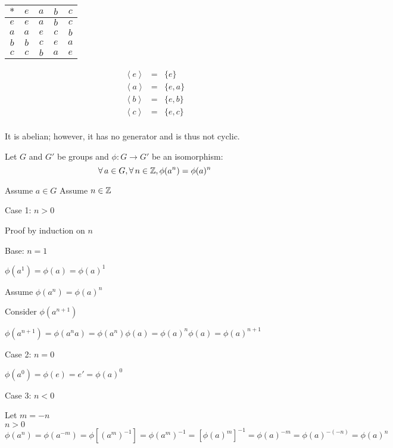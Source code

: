 \documentclass[letterpaper,12pt,fleqn]{article}
\newcommand{\cycle}[1]{\left<#1\right>}
\newcommand{\p}{\phi}
\begin{document}
\begin{minipage}{2in}
  \begin{tabular}{c|cccc}
    $*$ & $e$ & $a$ & $b$ & $c$ \\
    \hline
    $e$ & $e$ & $a$ & $b$ & $c$ \\
    $a$ & $a$ & $e$ & $c$ & $b$ \\
    $b$ & $b$ & $c$ & $e$ & $a$ \\
    $c$ & $c$ & $b$ & $a$ & $e$ \\
  \end{tabular}
\end{minipage}
\begin{minipage}{2in}
  \begin{eqnarray*}
    \cycle{e} &=& \{e\} \\
    \cycle{a} &=& \{e,a\} \\
    \cycle{b} &=& \{e,b\} \\
    \cycle{c} &=& \{e,c\} \\
  \end{eqnarray*}
\end{minipage}

It is abelian; however, it has no generator and is thus not cyclic.

\begin{theorem}
  Let $G$ and $G'$ be groups and $\p:G\to G'$ be an isomorphism:
  \[\forall\,a\in G,\forall\,n\in\Z,\p(a^n)=\p(a)^n\]
\end{theorem}

\begin{theproof}
  Assume $a\in G$
  Assume $n\in\mathbb{Z}$
  \begin{description}
  \item Case 1: $n>0$

    Proof by induction on $n$

    \begin{description}
    \item Base: $n=1$

      $\p(a^1)=\p(a)=\p(a)^1$

    \item Assume $\p(a^n)=\p(a)^n$

    \item Consider $\p(a^{n+1})$

      $\p(a^{n+1})=\p(a^na)=\p(a^n)\p(a)=\p(a)^n\p(a)=\p(a)^{n+1}$
    \end{description}

  \item Case 2: $n=0$

    $\p(a^0)=\p(e)=e'=\p(a)^0$
    
  \item Case 3: $n<0$

    Let $m=-n$ \\
    $n>0$ \\
    $\p(a^n)=\p(a^{-m})=\p[(a^m)^{-1}]=\p(a^m)^{-1}=[\p(a)^m]^{-1}=\p(a)^{-m}=
    \p(a)^{-(-n)}=\p(a)^n$
  \end{description}
\end{theproof}
\end{document}
